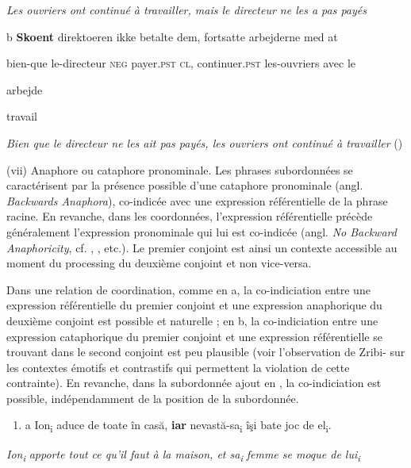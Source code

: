 {\itshape
Les ouvriers ont continué à travailler, mais le directeur ne les a pas payés}

  b  \textbf{Skoent}  direktoeren  ikke  betalte  dem,  fortsatte  arbejderne  med  at

    bien-que  le-directeur  \textsc{neg}  payer.\textsc{pst  cl, } continuer.\textsc{pst } les-ouvriers  avec  le 

  arbejde

    travail

    \textit{Bien que le directeur ne les ait pas payés, les ouvriers ont continué à travailler                       } (\citet[612]{Verstraete2005})

(vii) Anaphore ou cataphore pronominale. Les phrases subordonnées se caractérisent par la présence possible d'une cataphore pronominale (angl. \textit{Backwards Anaphora}), co-indicée avec une expression référentielle de la phrase racine. En revanche, dans les coordonnées, l'expression référentielle précède généralement l'expression pronominale qui lui est co-indicée (angl. \textit{No Backward Anaphoricity}, cf. \citet{Lang1984}, \citet{Haspelmath2004}, etc.). Le premier conjoint est ainsi un contexte accessible au moment du processing du deuxième conjoint et non vice-versa. 

Dans une relation de coordination, comme en a, la co-indiciation entre une expression référentielle du premier conjoint et une expression anaphorique du deuxième conjoint est possible et naturelle ; en b, la co-indiciation entre une expression cataphorique du premier conjoint et une expression référentielle se trouvant dans le second conjoint est peu plausible (voir l'observation de Zribi-\citet{Hertz1996} sur les contextes émotifs et contrastifs qui permettent la violation de cette contrainte). En revanche, dans la subordonnée ajout en , la co-indiciation est possible, indépendamment de la position de la subordonnée.


\begin{enumerate}
\item \label{bkm:Ref271663057}a  Ion\textsubscript{i} aduce de toate în casă, \textbf{iar} nevastă-sa\textsubscript{i} îşi bate joc de el\textsubscript{i}.


\end{enumerate}
\textit{Ion}\textit{\textsubscript{i}}\textit{ apporte tout ce qu'il faut à la maison, et sa}\textit{\textsubscript{i}}\textit{ femme se moque de lui}\textit{\textsubscript{i}}

